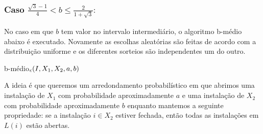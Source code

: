 \subsubsection*{Caso $\frac{\sqrt{3} - 1}{4} < b \leq \frac{2}{1 + \sqrt{3}}:$}

No caso em que $b$ tem valor no intervalo intermediário, o algoritmo {\sc b-médio} abaixo é executado. Novamente as escolhas aleatórias são feitas de acordo com a distribuição uniforme e os diferentes sorteios são independentes um do outro.
\begin{algorithm}[h]
    \caption{\sc b-médio$_\epsilon(I,X_1,X_2,a,b)$}
\end{algorithm}

A ideia é que queremos um arredondamento probabilístico em que abrimos uma instalação de $X_1$ com probabilidade aproximadamente $a$ e uma instalação de $X_2$ com probabilidade aproximadamente $b$ enquanto mantemos a seguinte propriedade: se a instalação $i \in X_2$ estiver fechada, então todas as instalações em $L(i)$ estão abertas.

